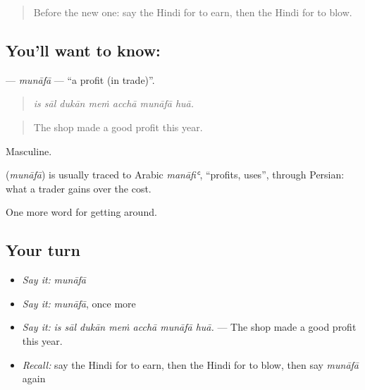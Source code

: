 \label{lesson:HI-C428-munafa}



\begin{quote}
Before the new one: say the Hindi for to earn, then the Hindi for to blow.
\end{quote}

\subsection*{You'll want to know: }
\textbf{} — \emph{munāfā} — \textquotedblleft{}a profit (in trade)\textquotedblright{}.

\begin{quote}
      
\end{quote}

\begin{quote}
\emph{is sāl dukān meṁ acchā munāfā huā.}
\end{quote}

\begin{quote}
The shop made a good profit this year.
\end{quote}

Masculine.

\begin{cousinweb}
\textbf{} (\emph{munāfā}) is usually traced to Arabic \emph{manāfiʿ}, \textquotedblleft{}profits, uses\textquotedblright{}, through Persian: what a trader gains over the cost.
\end{cousinweb}

\begin{grammarlens}[title={What you've built}]
One more word for getting around.
\end{grammarlens}

\subsection*{Your turn}
\begin{itemize}
\raggedright
  \item \emph{Say it:} \emph{munāfā}
  \item \emph{Say it:} \emph{munāfā}, once more
  \item \emph{Say it:} \emph{is sāl dukān meṁ acchā munāfā huā.} — The shop made a good profit this year.
  \item \emph{Recall:} say the Hindi for to earn, then the Hindi for to blow, then say \emph{munāfā} again
\end{itemize}


